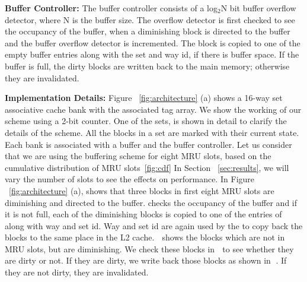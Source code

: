 \noindent\textbf{Buffer Controller:}
The buffer controller consists of a log$_2$N bit buffer overflow detector, where N is the buffer size.
The overflow detector is first checked to see the occupancy of the buffer,
when a diminishing block is directed to the buffer and the buffer overflow detector is incremented. 
The block is copied to one of the empty buffer entries along with the set and way id, if there is
buffer space.
If the buffer is full, the dirty blocks are written back to the main memory; otherwise they are  invalidated.

\noindent\textbf{Implementation Details:}
Figure ~\ref{fig:architecture} (a) shows a 16-way set associative cache bank with the associated tag array.
We show the working of
our scheme using a 2-bit counter.  One of the sets, is shown in detail to clarify the details of the scheme.
All the blocks in a set are marked with their current state. Each bank is  associated with a buffer and the buffer controller.
Let us consider that we are using the buffering scheme for eight MRU slots, based on the cumulative distribution
of MRU slots~\ref{fig:cdf}  
In Section ~\ref{sec:results}, we will vary the number of slots to see the effects on performance.
In Figure  ~\ref{fig:architecture} (a),  shows that three blocks in first eight MRU slots are diminishing and directed to the buffer.  checks
the occupancy of the buffer and if it is not full, each of the diminishing blocks is copied to one of the entries
of  along with way and set id. Way and set id are again used by the   to copy back the blocks to
the same place in the L2 cache. \textcircled{\raisebox{-.9pt}{A}} shows the blocks which are not in MRU slots,
but are diminishing. We check these blocks in \textcircled{\raisebox{-.9pt}{B}} to see whether they are dirty or not.
If they are dirty, we write back those blocks as shown in \textcircled{\raisebox{-.9pt}{C}}.  If they are not dirty, they are invalidated.



\begin{figure*} [t]
\centering
  \caption{\label{fig:cdf} \scriptsize \bf Cumulative Distribution of Dead Blocks per Bank with number of ways.}
\end{figure*}


